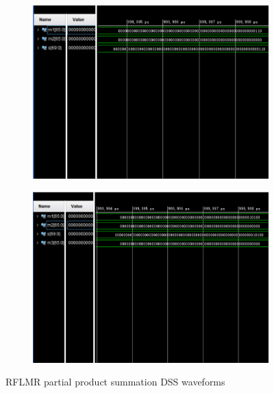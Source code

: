 \documentclass[electronics,article,accept,pdftex,moreauthors]{Definitions/mdpi}
\begin{document}
\begin{figure}[H]
  \captionsetup[subfigure]{justification=centering} 
  \begin{subfigure}[b]{0.47\textwidth}
    \centering
    \includegraphics[width=\textwidth]{images/12.png}
    \caption{}
    \label{fig10-sub1}
  \end{subfigure}
  \hfill
  \begin{subfigure}[b]{0.48\textwidth}
    \centering
    \includegraphics[width=\textwidth]{images/11.png}
    \caption{}
    \label{fig10-sub2}
  \end{subfigure}
    \caption{RFLMR partial product summation DSS waveforms} %
  \label{fig10}
\end{figure}
\end{document}
